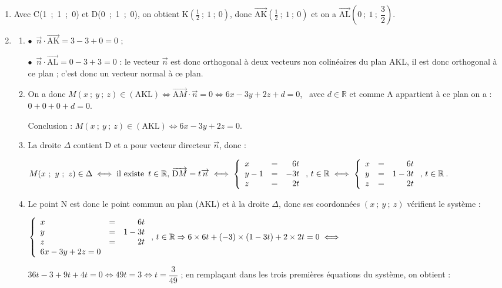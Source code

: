 \documentclass[10pt]{article}
\providecommand{\starredbullet}{\ensuremath{\bullet}}
\providecommand{\R}{\mathbb{R}}
\providecommand{\vect}[1]{\overrightarrow{#1}}
\begin{document}
\begin{enumerate}
\item 
Avec C(1~;~1~;~0) et D(0~;~1~;~0), on obtient K$\left(\frac{1}{2}~;~1~;~0\right)$, donc $\vect{\text{AK}}\left(\frac{1}{2}~;~1~;~0\right)$ et on a $\vect{\text{AL}}\left(0~;~1~;~\dfrac{3}{2}\right)$.
\item  
	\begin{enumerate}
		\item 
\starredbullet~$\vect{n} \cdot \vect{\text{AK}} = 3 - 3 + 0 = 0$ ;

\starredbullet~$\vect{n} \cdot \vect{\text{AL}} = 0 - 3 + 3 = 0$ : le vecteur $\vect{n}$ est donc orthogonal à deux vecteurs non colinéaires du plan AKL, il est donc orthogonal à ce plan ; c'est donc un vecteur normal à ce plan.
		\item 
On a donc $M(x~;~y~;~z) \in (\text{AKL}) \iff \vect{\text{A}M} \cdot \vect{n} = 0 \iff 6x - 3y + 2z + d = 0$, \, avec $d \in \R$  et comme A appartient à ce plan on a : $ 0 + 0 + 0 + d = 0$.

Conclusion : $M(x~;~y~;~z) \in (\text{AKL}) \iff 6x - 3y + 2z = 0$.
		\item 
La droite $\Delta$ contient D et a pour vecteur directeur $\vect{n}$, donc :

$M(x~;~y~;~z) \in \Delta \iff \text{il existe }\, t \in \R, \, \vect{\text{D}M} = t\vect{n} \iff \left\{\begin{array}{l c r}
x		&=&6t\\
y - 1	&=&-3t\\
z		&=&2t
\end{array}\right.,\, t \in \R \iff \left\{\begin{array}{l c r}
x		&=&6t\\
y		&=&1-3t\\
z		&=&2t
\end{array}\right.,\, t \in \R$.
		\item 
		Le point N est donc le point commun au plan (AKL) et à la droite $\Delta$, donc ses coordonnées $(x~;~y~;~z)$ vérifient le système :
		
		$\left\{\begin{array}{l c r}
x		&=&6t\\
y		&=&1-3t\\
z		&=&2t\\
6x - 3y + 2z = 0
\end{array}\right.,\, t \in \R \Rightarrow 6 \times 6t + (-3)\times (1 - 3t) + 2\times 2t = 0 \iff$

$36t - 3 + 9t + 4t = 0 \iff 49t = 3 \iff t = \dfrac{3}{49}$ ; en remplaçant dans les trois premières équations du système, on obtient :


\end{enumerate}
\end{enumerate}
\end{document}
